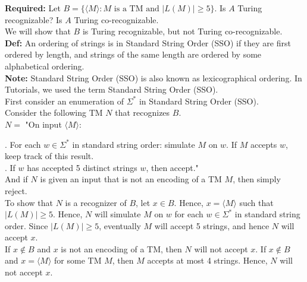 \documentclass[12pt]{article}
\begin{document}
\textbf{Required:} Let $B = \{\langle M \rangle : \text{$M$ is a TM and } |L(M)| \geq 5\}$. Is $A$ Turing recognizable? Is $A$ Turing co-recognizable. \\

We will show that $B$ is Turing recognizable, but not Turing co-recognizable. \\

\textbf{Def:} An ordering of strings is in Standard String Order (SSO) if they are first ordered by length, and strings of the same length are ordered by some alphabetical ordering. \\

\textbf{Note:} Standard String Order (SSO) is also known as lexicographical ordering. In Tutorials, we used the term Standard String Order (SSO). \\

First consider an enumeration of $\Sigma^*$ in Standard String Order (SSO). \\

Consider the following TM $N$ that recognizes $B$. \\

$N = $ "On input $\langle M \rangle$: \\

\setlength\parindent{15pt}

. For each $w \in \Sigma^*$ in standard string order: simulate $M$ on $w$. If $M$ accepts $w$, keep track of this result. \\

. If $w$ has accepted 5 distinct strings $w$, then accept." \\

\setlength\parindent{0pt}
And if $N$ is given an input that is not an encoding of a TM $M$, then simply reject. \\

To show that $N$ is a recognizer of $B$, let $x \in B$. Hence, $x = \langle M \rangle$ such that $|L(M)| \geq 5$. Hence, $N$ will simulate $M$ on $w$ for each $w \in \Sigma^*$ in standard string order. Since $|L(M)| \geq 5$, eventually $M$ will accept 5 strings, and hence $N$ will accept $x$. \\

If $x \not \in B$ and $x$ is not an encoding of a TM, then $N$ will not accept $x$. If $x \not \in B$ and $x = \langle M \rangle$ for some TM $M$, then $M$ accepts at most 4 strings. Hence, $N$ will not accept $x$. \\
\end{document}
